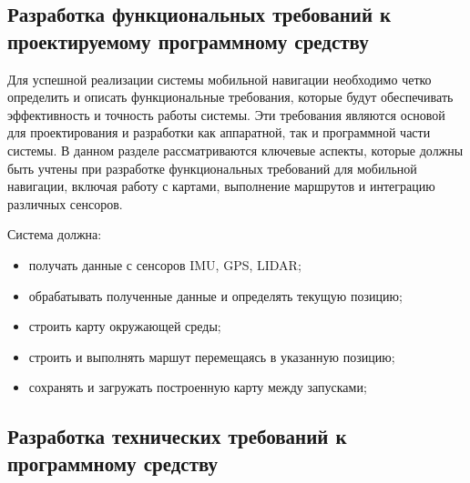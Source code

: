 {%
%
%
%

\subsection{Разработка функциональных требований к проектируемому программному
средству}
	Для успешной реализации системы мобильной навигации необходимо четко
	определить и описать функциональные требования, которые будут обеспечивать
	эффективность и точность работы системы. Эти требования являются основой для
	проектирования и разработки как аппаратной, так и программной части системы.
	В данном разделе рассматриваются ключевые аспекты, которые должны быть
	учтены при разработке функциональных требований для мобильной навигации,
	включая работу с картами, выполнение маршрутов и интеграцию различных
	сенсоров.

Система должна:
\begin{itemize}
	\item получать данные с сенсоров IMU, GPS, LIDAR;
	\item обрабатывать полученные данные и определять текущую позицию;
	\item строить карту окружающей среды;
	\item строить и выполнять маршут перемещаясь в указанную позицию;
	\item сохранять и загружать построенную карту между запусками;
\end{itemize}

\subsection{Разработка технических требований к программному средству}

}
